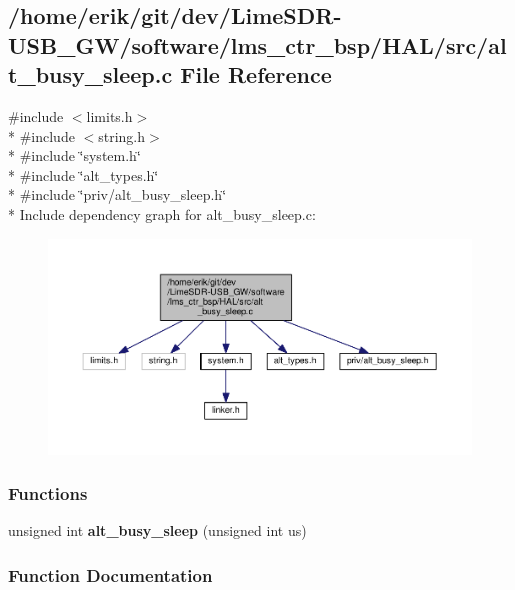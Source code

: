\subsection{/home/erik/git/dev/\+Lime\+S\+D\+R-\/\+U\+S\+B\+\_\+\+G\+W/software/lms\+\_\+ctr\+\_\+bsp/\+H\+A\+L/src/alt\+\_\+busy\+\_\+sleep.c File Reference}
\label{alt__busy__sleep_8c}
{\ttfamily \#include $<$limits.\+h$>$}\\*
{\ttfamily \#include $<$string.\+h$>$}\\*
{\ttfamily \#include \char`\"{}system.\+h\char`\"{}}\\*
{\ttfamily \#include \char`\"{}alt\+\_\+types.\+h\char`\"{}}\\*
{\ttfamily \#include \char`\"{}priv/alt\+\_\+busy\+\_\+sleep.\+h\char`\"{}}\\*
Include dependency graph for alt\+\_\+busy\+\_\+sleep.\+c\+:
\nopagebreak
\begin{figure}[H]
\begin{center}
\leavevmode
\includegraphics[width=350pt]{da/d09/alt__busy__sleep_8c__incl}
\end{center}
\end{figure}
\subsubsection*{Functions}
\begin{DoxyCompactItemize}
\item 
unsigned int {\bf alt\+\_\+busy\+\_\+sleep} (unsigned int us)
\end{DoxyCompactItemize}


\subsubsection{Function Documentation}
